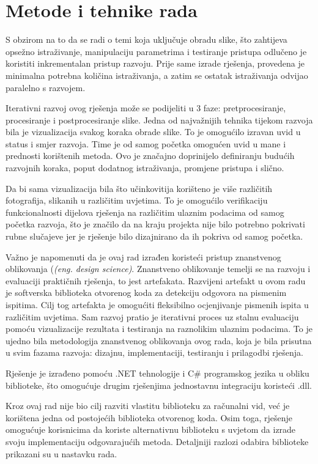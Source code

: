 \documentclass{foi}
\begin{document}
\chapter{Metode i tehnike rada}

S obzirom na to da se radi o temi koja uključuje obradu slike, što zahtijeva opsežno istraživanje, manipulaciju parametrima i testiranje pristupa odlučeno je koristiti inkrementalan pristup razvoju. Prije same izrade rješenja, provedena je minimalna potrebna količina istraživanja, a zatim se ostatak istraživanja odvijao paralelno s razvojem.

Iterativni razvoj ovog rješenja može se podijeliti u 3 faze: pretprocesiranje, procesiranje i postprocesiranje slike. Jedna od najvažnijih tehnika tijekom razvoja bila je  vizualizacija svakog koraka obrade slike. To je omogućilo izravan uvid u status i smjer razvoja. Time je od samog početka omogućen uvid u mane i prednosti korištenih metoda. Ovo je značajno doprinijelo definiranju budućih razvojnih koraka, poput  dodatnog istraživanja, promjene pristupa i slično. 

Da bi sama vizualizacija bila što učinkovitija korišteno je više različitih fotografija, slikanih u različitim uvjetima. To je omogućilo verifikaciju funkcionalnosti dijelova rješenja na različitim ulaznim podacima od samog početka razvoja, što je značilo da na kraju projekta nije bilo potrebno pokrivati rubne slučajeve jer je rješenje bilo dizajnirano da ih pokriva od samog početka.

Važno je napomenuti da je ovaj rad izrađen koristeći pristup znanstvenog oblikovanja (\textit{(eng. design science)}. Znanstveno oblikovanje temelji se na razvoju i evaluaciji praktičnih rješenja, to jest artefakata. Razvijeni artefakt u ovom radu je softverska biblioteka otvorenog koda za detekciju odgovora na pismenim ispitima. Cilj tog artefakta je omogućiti fleksibilno ocjenjivanje pismenih ispita u različitim uvjetima. Sam razvoj pratio je iterativni proces uz stalnu evaluaciju pomoću vizualizacije rezultata i testiranja na raznolikim ulaznim podacima. To je ujedno bila metodologija znanstvenog oblikovanja ovog rada, koja je bila prisutna u svim fazama razvoja: dizajnu, implementaciji, testiranju i prilagodbi rješenja.

Rješenje je izrađeno pomoću .NET tehnologije i C\# programskog jezika u obliku biblioteke, što omogućuje drugim rješenjima jednostavnu integraciju koristeći .dll. 

Kroz ovaj rad nije bio cilj razviti vlastitu biblioteku za računalni vid, već je korištena jedna od postojećih biblioteka otvorenog koda. Osim toga, rješenje omogućuje korisnicima da koriste alternativnu biblioteku s uvjetom da izrade svoju implementaciju odgovarajućih metoda. Detaljniji razlozi odabira biblioteke prikazani su u nastavku rada.
\end{document}
